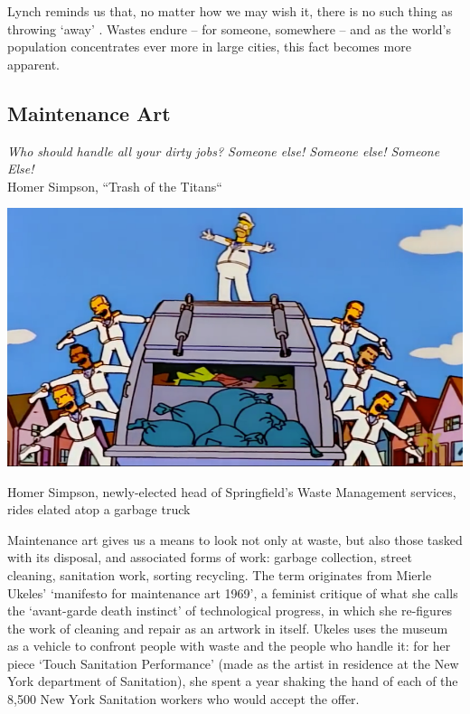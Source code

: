 \documentclass[nofonts,nols,justified,nobib]{tufte-book}
\begin{document}
Lynch reminds us that, no matter how we may wish it, there is no such thing as throwing `away' \cite{lynch_wasting_1990}. Wastes endure -- for someone, somewhere -- and as the world's population concentrates ever more in large cities, this fact becomes more apparent.

\subsection*{Maintenance Art}

\begin{flushright}
\emph{Who should handle all your dirty jobs? Someone else! Someone else! Someone Else!} \cite{reardon_trash_1998}\\
Homer Simpson, ``Trash of the Titans``
\end{flushright}

\begin{marginfigure}
\includegraphics[width=\textwidth]{img/1/simpson-truck.png}
\caption{Homer Simpson, newly-elected head of Springfield's Waste Management services, rides elated atop a garbage truck \cite{reardon_trash_1998} }
\end{marginfigure}

Maintenance art gives us a means to look not only at waste, but also those tasked with its disposal, and associated forms of work: garbage collection, street cleaning, sanitation work, sorting recycling. The term originates from Mierle Ukeles'  `manifesto for maintenance art 1969'\cite{ukeles_manifesto_1969}, a feminist critique of what she calls the `avant-garde death instinct' of technological progress, in which she re-figures the work of cleaning and repair as an artwork in itself. Ukeles uses the museum as a vehicle to confront people with waste and the people who handle it: for her piece `Touch Sanitation Performance' (made as the artist in residence at the New York department of Sanitation), she spent a year shaking the hand of each of the 8,500 New York Sanitation workers who would accept the offer.\cite{ukeles_touch_1980}
\end{document}
